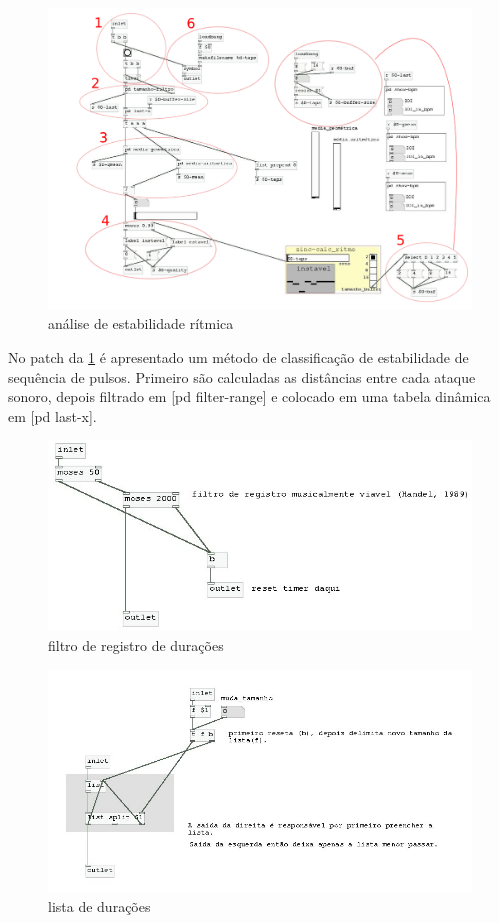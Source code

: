 \documentclass{ppgmus}
\begin{document}
\begin{figure}
\includegraphics[scale=.5]{sinc-calc-ritmo}
\caption{análise de estabilidade rítmica}
\label{[sinc-calc-ritmo]}
\end{figure}

No patch da \ref{[sinc-calc-ritmo]} é apresentado um método de classificação de estabilidade
de sequência de pulsos. Primeiro são calculadas as distâncias entre cada ataque
sonoro, depois filtrado em [pd filter-range] e colocado em uma tabela dinâmica em
[pd last-x]. 


\begin{figure}
\includegraphics[scale=.6]{sinc-calc-ritmo1}
\caption{filtro de registro de durações}
\label{[sinc-calc-ritmo1]}
\end{figure}

\begin{figure}
\includegraphics[scale=.6]{sinc-calc-ritmo2}
\caption{lista de durações}
\label{[sinc-calc-ritmo2]}
\end{figure}
\end{document}
